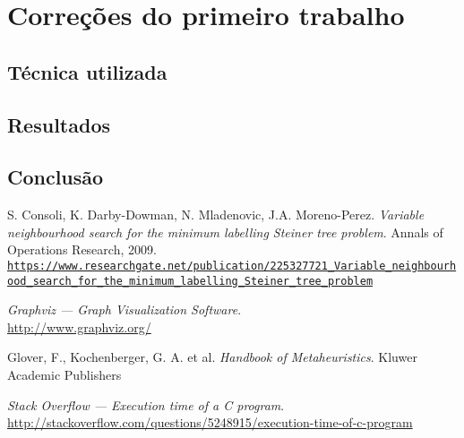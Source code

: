\documentclass[12pt, a4paper]{article}
\begin{document}
\section{Correções do primeiro trabalho}
\subsection{Técnica utilizada}
\subsection{Resultados}
\subsection{Conclusão}

\begin{thebibliography}{9}

S. Consoli, K. Darby-Dowman, N. Mladenovic, J.A. Moreno-Perez.
\textit{Variable neighbourhood search for the minimum labelling Steiner tree
problem}.
Annals of Operations Research, 2009.
\tiny
\\\texttt{\url{https://www.researchgate.net/publication/225327721_Variable_neighbourhood_search_for_the_minimum_labelling_Steiner_tree_problem}}
\normalsize

\textit{Graphviz --- Graph Visualization Software}. \\
\url{http://www.graphviz.org/}

Glover, F., Kochenberger, G. A. et al.
\textit{Handbook of Metaheuristics}.
Kluwer Academic Publishers
\tiny
\normalsize

\textit{Stack Overflow --- Execution time of a C program}. \\
\url{http://stackoverflow.com/questions/5248915/execution-time-of-c-program}

\end{thebibliography}
\end{document}
